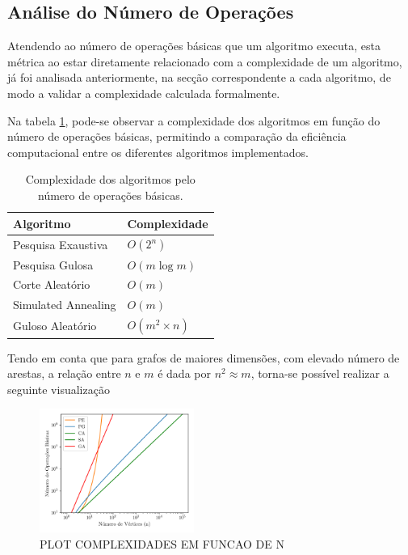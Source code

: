 \documentclass[mirror, portugues]{revdetua}
\begin{document}
\subsection{Análise do Número de Operações}

Atendendo ao número de operações básicas que um algoritmo executa, esta métrica ao estar diretamente relacionado com a complexidade de um algoritmo, já foi analisada anteriormente, na secção correspondente a cada algoritmo, de modo a validar a complexidade calculada formalmente.

Na tabela \ref{table:numops}, pode-se observar a complexidade dos algoritmos em função do número de operações básicas, permitindo a comparação da eficiência computacional entre os diferentes algoritmos implementados.

\begin{table}[H]
\centering
\caption{Complexidade dos algoritmos pelo número de operações básicas.}
\label{table:numops}
\begin{tabular}{ll}
\toprule
\textbf{Algoritmo} & \textbf{Complexidade} \\
\midrule
Pesquisa Exaustiva & $O(2^n)$ \\
Pesquisa Gulosa & $O(m \log m)$ \\
Corte Aleatório & $O(m)$ \\
Simulated Annealing & $O(m)$ \\
Guloso Aleatório & $O(m^2 \times n)$ \\
\bottomrule
\end{tabular}
\end{table}

Tendo em conta que para grafos de maiores dimensões, com elevado número de arestas, a relação entre $n$ e $m$ é dada por $n^2 \approx m$, torna-se possível realizar a seguinte visualização

\begin{figure}[H]
    \centering
    \includegraphics[width=0.45\textwidth]{../assets/basicops.png}
    \caption{PLOT COMPLEXIDADES EM FUNCAO DE N}
    \label{fig:total_ops_per_alg}
\end{figure}
\end{document}
